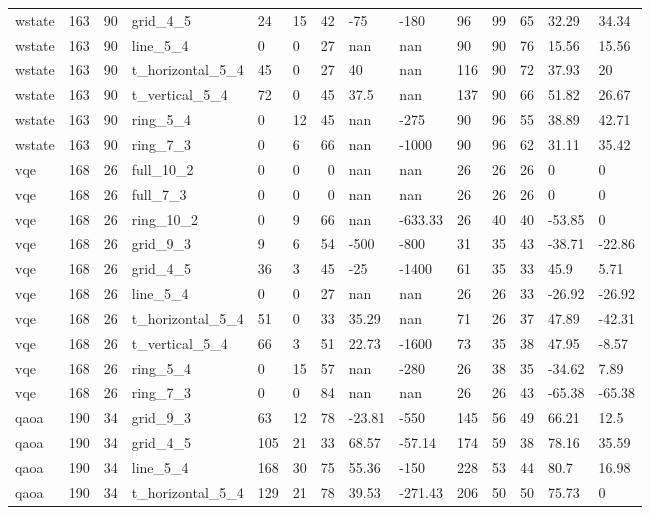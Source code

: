\begin{longtable}{lrrlllrllllrll}
wstate & 163 & 90 & grid\_4\_5 & 24 & 15 & 42 & -75 & -180 & 96 & 99 & 65 & 32.29 & 34.34 \\
wstate & 163 & 90 & line\_5\_4 & 0 & 0 & 27 & nan & nan & 90 & 90 & 76 & 15.56 & 15.56 \\
wstate & 163 & 90 & t\_horizontal\_5\_4 & 45 & 0 & 27 & 40 & nan & 116 & 90 & 72 & 37.93 & 20 \\
wstate & 163 & 90 & t\_vertical\_5\_4 & 72 & 0 & 45 & 37.5 & nan & 137 & 90 & 66 & 51.82 & 26.67 \\
wstate & 163 & 90 & ring\_5\_4 & 0 & 12 & 45 & nan & -275 & 90 & 96 & 55 & 38.89 & 42.71 \\
wstate & 163 & 90 & ring\_7\_3 & 0 & 6 & 66 & nan & -1000 & 90 & 96 & 62 & 31.11 & 35.42 \\
vqe & 168 & 26 & full\_10\_2 & 0 & 0 & 0 & nan & nan & 26 & 26 & 26 & 0 & 0 \\
vqe & 168 & 26 & full\_7\_3 & 0 & 0 & 0 & nan & nan & 26 & 26 & 26 & 0 & 0 \\
vqe & 168 & 26 & ring\_10\_2 & 0 & 9 & 66 & nan & -633.33 & 26 & 40 & 40 & -53.85 & 0 \\
vqe & 168 & 26 & grid\_9\_3 & 9 & 6 & 54 & -500 & -800 & 31 & 35 & 43 & -38.71 & -22.86 \\
vqe & 168 & 26 & grid\_4\_5 & 36 & 3 & 45 & -25 & -1400 & 61 & 35 & 33 & 45.9 & 5.71 \\
vqe & 168 & 26 & line\_5\_4 & 0 & 0 & 27 & nan & nan & 26 & 26 & 33 & -26.92 & -26.92 \\
vqe & 168 & 26 & t\_horizontal\_5\_4 & 51 & 0 & 33 & 35.29 & nan & 71 & 26 & 37 & 47.89 & -42.31 \\
vqe & 168 & 26 & t\_vertical\_5\_4 & 66 & 3 & 51 & 22.73 & -1600 & 73 & 35 & 38 & 47.95 & -8.57 \\
vqe & 168 & 26 & ring\_5\_4 & 0 & 15 & 57 & nan & -280 & 26 & 38 & 35 & -34.62 & 7.89 \\
vqe & 168 & 26 & ring\_7\_3 & 0 & 0 & 84 & nan & nan & 26 & 26 & 43 & -65.38 & -65.38 \\
qaoa & 190 & 34 & grid\_9\_3 & 63 & 12 & 78 & -23.81 & -550 & 145 & 56 & 49 & 66.21 & 12.5 \\
qaoa & 190 & 34 & grid\_4\_5 & 105 & 21 & 33 & 68.57 & -57.14 & 174 & 59 & 38 & 78.16 & 35.59 \\
qaoa & 190 & 34 & line\_5\_4 & 168 & 30 & 75 & 55.36 & -150 & 228 & 53 & 44 & 80.7 & 16.98 \\
qaoa & 190 & 34 & t\_horizontal\_5\_4 & 129 & 21 & 78 & 39.53 & -271.43 & 206 & 50 & 50 & 75.73 & 0 \\

\end{longtable}
